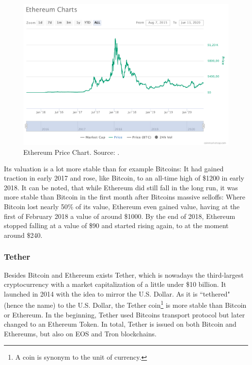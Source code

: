 \documentclass[11pt,a4paper,compsoc,conference]{IEEEtran}
\begin{document}
\begin{figure}[H]
    \centering
    \includegraphics[width=\linewidth]{figures/Ethereum-charts.pdf}
    \caption[Ethereum Price Chart]{Ethereum Price Chart. Source: \citep{coinmarketcap}. }
    \label{fig:Ethereum}
\end{figure}

Its valuation is a lot more stable than for example Bitcoins: It had gained traction in early 2017 and rose, like Bitcoin, to an all-time high of \$1200  in early 2018. It can be noted, that while Ethereum did still fall in the long run, it was more stable than Bitcoin in the first month after Bitcoins massive selloffs: Where Bitcoin lost nearly 50\% of its value, Ethereum even gained value, having at the first of February 2018 a value of around \$1000. By the end of 2018, Ethereum stopped falling at a value of \$90  and started rising again, to at the moment around \$240.

\subsubsection{Tether}
Besides Bitcoin and Ethereum exists Tether, which is nowadays the third-largest cryptocurrency with a market capitalization of a little under \$10 billion. It launched in 2014 with the idea to mirror the U.S. Dollar. As it is ``tethered" (hence the name) to the U.S. Dollar, the Tether coin\footnote{A coin is synonym to the unit of currency.} is more stable than Bitcoin or Ethereum. In the beginning, Tether used Bitcoins transport protocol but later changed to an Ethereum Token. In total, Tether is issued on both Bitcoin and Ethereums, but also on EOS and Tron blockchains.
\end{document}
